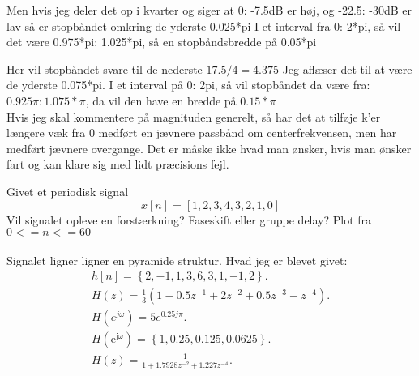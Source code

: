 \begin{Opgaver}
\begin{kapitel}
\begin{Opgave}
\begin{UnderOpgave}[Now consider a cascade of 3 FIR notch filters, \text{$H(z)=b_{0}\prod_{k=-1}^{1}H_k(z)$} of the form]
                Men hvis jeg deler det op i kvarter og siger at 0: -7.5dB er høj, og -22.5: -30dB er lav så er stopbåndet omkring de yderste 0.025*pi
                I et interval fra 0: 2*pi, så vil det være 0.975*pi: 1.025*pi, så en stopbåndsbredde på 0.05*pi
            \end{UnderOpgave}
            \begin{UnderOpgave}[Repeat (c) for a cascade of five FIR notch filters using k = -2, 1, 0, 1, 2. Comment on your plot in terms of stopband width.]
                Her vil stopbåndet svare til de nederste $17.5/4 = 4.375$
                Jeg aflæser det til at være de yderste 0.075*pi. I et interval på 0: 2pi, så vil stopbåndet da være fra:\\
                $0.925\pi : 1.075*\pi$, da vil den have en bredde på $0.15*\pi$\\
                Hvis jeg skal kommentere på magnituden generelt, så har det at tilføje k'er længere væk fra 0 medført en jævnere passbånd om centerfrekvensen, men har 
                medført jævnere overgange. Det er måske ikke hvad man ønsker, hvis man ønsker fart og kan klare sig med lidt præcisions fejl. 
            \end{UnderOpgave}
        \end{Opgave}
        \begin{Opgave}
            Givet et periodisk signal 
            \[x[n] = [1, 2, 3, 4, 3, 2, 1, 0]\]
            Vil signalet opleve en forstærkning? Faseskift eller gruppe delay? 
            Plot fra $0 <= n <= 60$\\\\
            Signalet ligner ligner en pyramide struktur. 
            Hvad jeg er blevet givet:
            \[\begin{array}{l}
                {{h[n]=\left\{2,-1,1,3,6,3,1,-1,2\right\}.}}\\ 
                {{H(z)=\frac{1}{3}(1-0.5z^{-1}+2z^{-2}+0.5z^{-3}-z^{-4}).}}\\ 
                {{H(e^{j\omega}) = 5e^{0.25j\pi}.}}\\
                {{H(\mathrm{e}^{\mathrm{j}\omega})=\left\{1,0.25,0.125,0.0625\right\}.}}\\ 
                {{H(z)=\frac{1}{1+1.7928z^{-2}+1.227z^{-4}}.}}\end{array}\]\\\\


\end{Opgave}
\end{kapitel}
\end{Opgaver}
